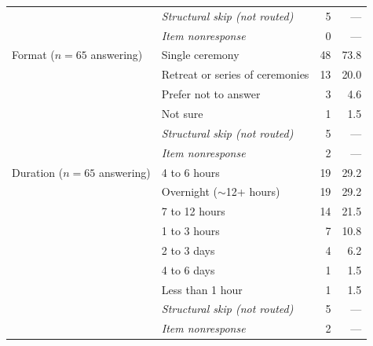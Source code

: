 \documentclass[12pt]{article}
\begin{document}
\begin{table}[htbp]
\begin{tabular}{p{4.2cm}p{5.8cm}rr}
                 & \emph{Structural skip (not routed)} & 5 & --- \\
                 & \emph{Item nonresponse} & 0 & --- \\
\addlinespace
Format ($n=65$ answering)  & Single ceremony & 48 & 73.8 \\
                 & Retreat or series of ceremonies & 13 & 20.0 \\
                 & Prefer not to answer & 3 & 4.6 \\
                 & Not sure & 1 & 1.5 \\
                 & \emph{Structural skip (not routed)} & 5 & --- \\
                 & \emph{Item nonresponse} & 2 & --- \\
\addlinespace
Duration ($n=65$ answering) & 4 to 6 hours & 19 & 29.2 \\
                 & Overnight ($\sim$12+ hours) & 19 & 29.2 \\
                 & 7 to 12 hours & 14 & 21.5 \\
                 & 1 to 3 hours & 7 & 10.8 \\
                 & 2 to 3 days & 4 & 6.2 \\
                 & 4 to 6 days & 1 & 1.5 \\
                 & Less than 1 hour & 1 & 1.5 \\
                 & \emph{Structural skip (not routed)} & 5 & --- \\
                 & \emph{Item nonresponse} & 2 & --- \\
\bottomrule
\end{tabular}
\end{table}
\end{document}
